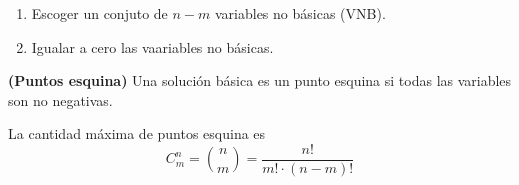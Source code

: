 \documentclass[../main.tex]{subfiles}
\begin{document}
        \begin{enumerate}
            \item Escoger un conjuto de $n-m$ variables no básicas (VNB).
            \item Igualar a cero las vaariables no básicas.
        \end{enumerate}

        \begin{definition} \textbf{(Puntos esquina)}
            Una solución básica es un punto esquina si todas las variables son no negativas.
            
            La cantidad máxima de puntos esquina es 
            \begin{equation}
                C^n_m = \binom{n}{m} = \frac{n!}{m! \cdot (n-m)!}
            \end{equation} 
            
        \end{definition}
\end{document}
